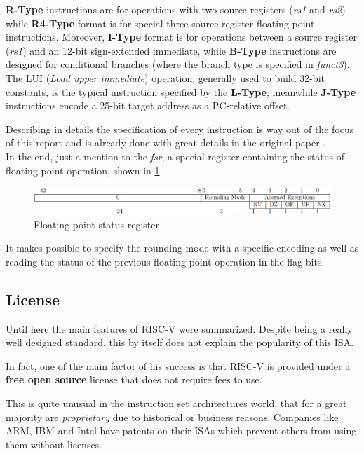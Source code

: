 \documentclass[12pt,oneside,a4paper]{article}
\begin{document}
\textbf{R-Type} instructions are for operations with two source registers (\textit{rs1} and \textit{rs2}) while \textbf{R4-Type} format is for special three source register floating point instructions. Moreover, \textbf{I-Type} format is for operations between a source register (\textit{rs1}) and an 12-bit sign-extended immediate, while \textbf{B-Type} instructions are designed for conditional branches (where the branch type is specified in \textit{funct3}).
The LUI (\textit{Load upper immediate}) operation, generally used to build 32-bit constants, is the typical instruction specified by the \textbf{L-Type}, meanwhile \textbf{J-Type} instructions encode a 25-bit target address as a PC-relative offset.

Describing in details the specification of every instruction is way out of the focus of this report and is already done with great details in the original paper \cite{risc-v_original}.\\

In the end, just a mention to the \textit{fsr}, a special register containing the status of floating-point operation, shown in \cref{riscv:fsr}.

\begin{figure}[h]
	\centering
	\includegraphics[scale=0.575]{risc-v_fsr}
	\caption{Floating-point status register}
	\label{riscv:fsr}
\end{figure}

It makes possible to specify the rounding mode with a specific encoding as well as reading the status of the previous floating-point operation in the flag bits.\\
\subsection{License}
Until here the main features of RISC-V were summarized.
Despite being a really well designed standard, this by itself does not explain the popularity of this ISA.

In fact, one of the main factor of his success is that RISC-V is provided under a \textbf{free open source} license that does not require fees to use.

This is quite unusual in the instruction set architectures world, that for a great majority are \textit{proprietary} due to historical or business reasons. Companies like ARM, IBM and Intel have patents on their ISAs which prevent others from using them without licenses.
\end{document}
